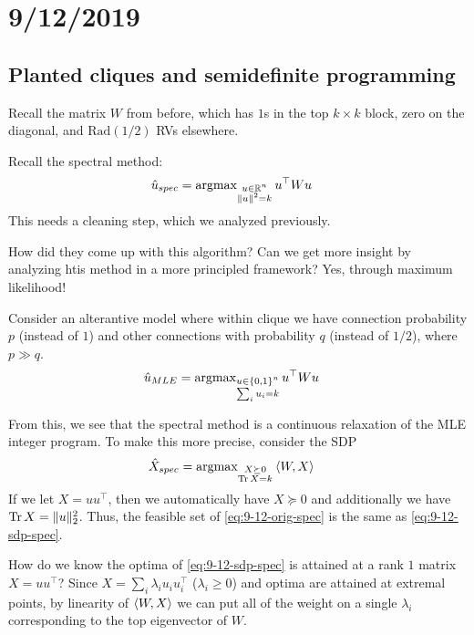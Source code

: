\section{9/12/2019}

\subsection{Planted cliques and semidefinite programming}

Recall the matrix $W$ from before, which has $1$s in the top $k \times k$ block, zero on the diagonal, and $\text{Rad}(1/2)$ RVs elsewhere.

Recall the spectral method:
\begin{align}\label{eq:9-12-orig-spec}
    \hat{u}_{spec} &= \operatorname{argmax}_{\substack{u \in \mathbb{R}^n \\ \|u\|^2 = k}} u^\top W u
\end{align}
This needs a cleaning step, which we analyzed previously.

How did they come up with this algorithm?
Can we get more insight by analyzing htis method in a more principled framework?
Yes, through maximum likelihood!

Consider an alterantive model where within clique we have connection probability $p$ (instead of $1$) and other connections with probability $q$ (instead of $1/2$),
where $p \gg q$.
\begin{align}\label{eq:9-12-mle}
    \hat{u}_{MLE} &= \operatorname{argmax}_{\substack{u \in \{0,1\}^n \\ \sum_i u_i = k}} u^\top W u
\end{align}

From this, we see that the spectral method is a continuous relaxation of the
MLE integer program. To make this more precise, consider the SDP
\begin{align}\label{eq:9-12-sdp-spec}
    \hat{X}_{spec} &= \operatorname{argmax}_{\substack{X \succeq 0 \\ \operatorname{Tr} X = k}} \braket{W, X}
\end{align}
If we let $X = u u^\top$, then we automatically have $X \succeq 0$ and additionally we have $\operatorname{Tr} X = \|u\|_2^2$. Thus, the feasible set of
\cref{eq:9-12-orig-spec} is the same as \cref{eq:9-12-sdp-spec}.

How do we know the optima of \cref{eq:9-12-sdp-spec} is attained at a rank $1$ matrix
$X = u u^\top$? Since $X = \sum_i \lambda_i u_i u_i^\top$ ($\lambda_i \geq 0$) 
and optima are attained at extremal points, by linearity of $\braket{W,X}$ we can
put all of the weight on a single $\lambda_i$ corresponding to the top eigenvector
of $W$.

